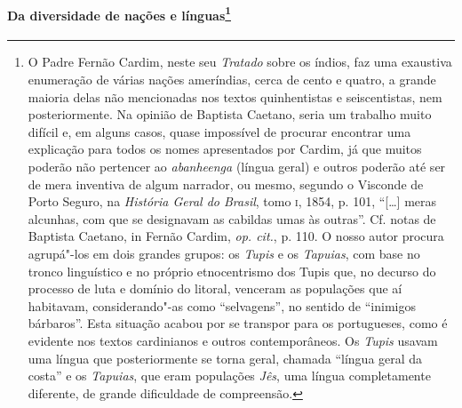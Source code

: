 \paragraph[Da diversidade de nações e línguas]{Da diversidade de nações e línguas\protect\footnote{ O
Padre Fernão Cardim, neste seu \textit{Tratado} sobre os índios, faz
uma exaustiva enumeração de várias nações ameríndias, cerca de cento e
quatro, a grande maioria delas não mencionadas nos textos quinhentistas
e seiscentistas, nem posteriormente. Na opinião de Baptista Caetano,
seria um trabalho muito difícil e, em alguns casos, quase impossível de
procurar encontrar uma explicação para todos os nomes apresentados por
Cardim, já que muitos poderão não pertencer ao \textit{abanheenga}
(língua geral) e outros poderão até ser de mera inventiva de algum
narrador, ou mesmo, segundo o Visconde de Porto Seguro, na
\textit{História Geral do Brasil}, tomo \textsc{i}, 1854, p. 101, ``[\ldots{}] meras
alcunhas, com que se designavam as cabildas umas às outras''. Cf.
notas de Baptista Caetano, in Fernão Cardim, \textit{op. cit.}, p. 110.
O nosso autor procura agrupá"-los em dois grandes grupos: os
\textit{Tupis} e os \textit{Tapuias}, com base no tronco linguístico e no
próprio etnocentrismo dos Tupis que, no decurso do processo de luta e
domínio do litoral, venceram as populações que aí habitavam,
considerando"-as como ``selvagens'', no sentido de ``inimigos bárbaros''. 
Esta situação acabou por se transpor para os portugueses, como é
evidente nos textos cardinianos e outros contemporâneos. Os
\textit{Tupis} usavam uma língua que posteriormente se torna geral,
chamada ``língua geral da costa'' e os \textit{Tapuias}, que eram
populações \textit{Jês}, uma língua completamente diferente, de grande
dificuldade de compreensão.}}

